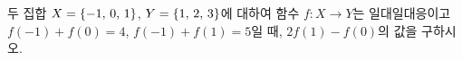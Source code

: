 \hspace*{2mm}\begin{minipage}[t]{\dimexpr\linewidth-2mm\relax}\vspace{0pt}
두 집합 $X=\{-1,\mkern3mu 0,\mkern3mu 1\}$, $Y=\{1,\mkern3mu 2,\mkern3mu 3\}$에 대하여 함수 $f:X\longrightarrow Y$는 일대일대응이고 $f(-1)+f(0)=4$, $f(-1)+f(1)=5$일 때, $2f(1)-f(0)$의 값을 구하시오.\end{minipage}
